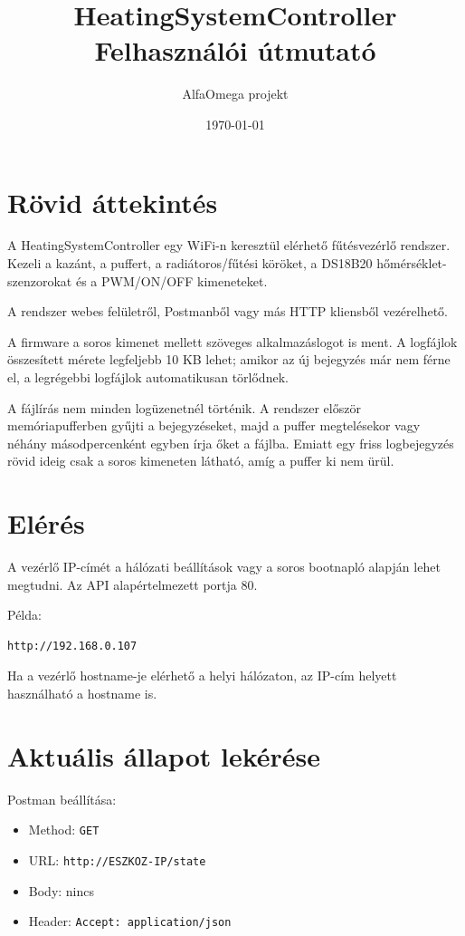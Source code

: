 \documentclass[11pt,a4paper]{article}
\title{HeatingSystemController\\Felhasználói útmutató}
\author{AlfaOmega projekt}
\date{\today}
\begin{document}
\maketitle
\tableofcontents
\newpage

\section{Rövid áttekintés}

A HeatingSystemController egy WiFi-n keresztül elérhető fűtésvezérlő rendszer. Kezeli a kazánt, a puffert, a radiátoros/fűtési köröket, a DS18B20 hőmérséklet-szenzorokat és a PWM/ON/OFF kimeneteket.

A rendszer webes felületről, Postmanből vagy más HTTP kliensből vezérelhető.

A firmware a soros kimenet mellett szöveges alkalmazáslogot is ment. A logfájlok összesített mérete legfeljebb 10 KB lehet; amikor az új bejegyzés már nem férne el, a legrégebbi logfájlok automatikusan törlődnek.

A fájlírás nem minden logüzenetnél történik. A rendszer először memóriapufferben gyűjti a bejegyzéseket, majd a puffer megtelésekor vagy néhány másodpercenként egyben írja őket a fájlba. Emiatt egy friss logbejegyzés rövid ideig csak a soros kimeneten látható, amíg a puffer ki nem ürül.

\section{Elérés}

A vezérlő IP-címét a hálózati beállítások vagy a soros bootnapló alapján lehet megtudni. Az API alapértelmezett portja 80.

Példa:

\begin{lstlisting}
http://192.168.0.107
\end{lstlisting}

Ha a vezérlő hostname-je elérhető a helyi hálózaton, az IP-cím helyett használható a hostname is.

\section{Aktuális állapot lekérése}

Postman beállítása:

\begin{itemize}
  \item Method: \texttt{GET}
  \item URL: \texttt{http://ESZKOZ-IP/state}
  \item Body: nincs
  \item Header: \texttt{Accept: application/json}
\end{itemize}
\end{document}
